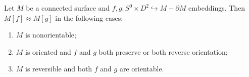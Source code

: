 Let $M$ be a connected surface and $f, g: S^0 \times D^2 \hookrightarrow M - \partial M$ embeddings. Then $M[f] \approx M[g]$ in the following cases:
\begin{enumerate}
\item[(a)] $M$ is nonorientable;
\item[(b)] $M$ is oriented and $f$ and $g$ both preserve or both reverse orientation;
\item[(c)] $M$ is reversible and both $f$ and $g$ are orientable.
\end{enumerate}
